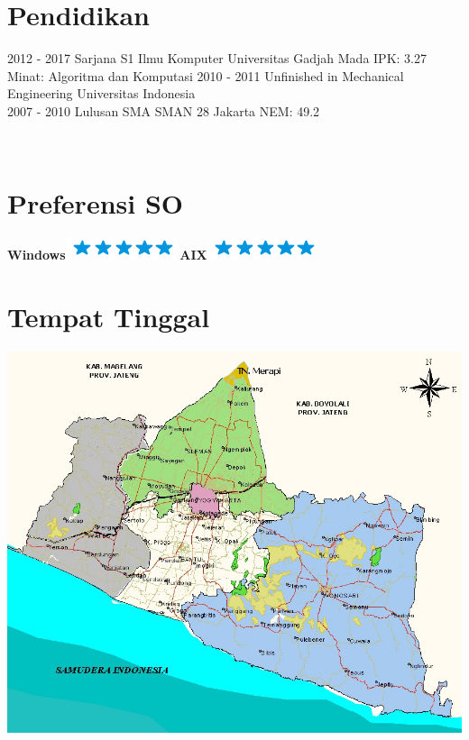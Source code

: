 \documentclass[]{friggeri-cv}
\begin{document}
\section{Pendidikan}
\begin{entrylist}
  \entry
    {2012 - 2017}
    {Sarjana S1 Ilmu Komputer}
    {Universitas Gadjah Mada}
    {IPK: 3.27\\
    Minat: Algoritma dan Komputasi
    }
  \entry  
    {2010 - 2011}
    {Unfinished in Mechanical Engineering}
    {Universitas Indonesia}
    {\\}
  \entry
    {2007 - 2010}
    {Lulusan SMA}
    {SMAN 28 Jakarta}
    {NEM: 49.2}
\end{entrylist}


\begin{aside}
~
~
~
  \section{Preferensi SO}
	\textbf{Windows}\includegraphics[scale=0.40]{img/5stars.png}
    \textbf{AIX}\includegraphics[scale=0.40]{img/5stars.png}
    ~
  \section{Tempat Tinggal}
    \includegraphics[scale=0.1]{img/peta_diy.jpg}
    ~

\end{aside}
\end{document}
